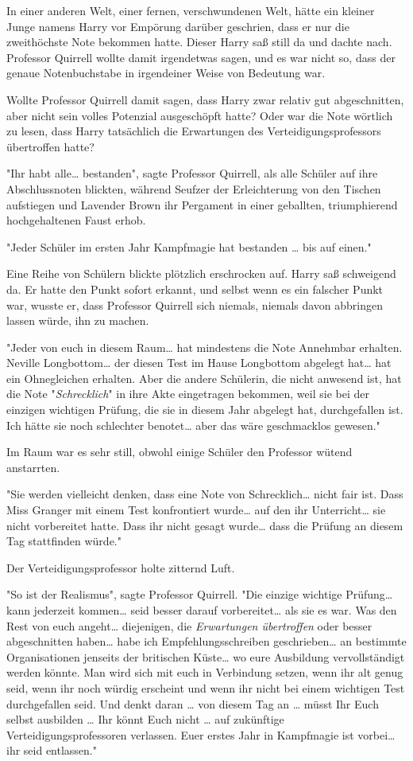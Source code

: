 {In einer anderen Welt, einer fernen, verschwundenen Welt, hätte ein kleiner Junge namens Harry vor Empörung darüber geschrien, dass er nur die zweithöchste Note bekommen hatte. Dieser Harry saß still da und dachte nach. Professor Quirrell wollte damit irgendetwas sagen, und es war nicht so, dass der genaue Notenbuchstabe in irgendeiner Weise von Bedeutung war.

Wollte Professor Quirrell damit sagen, dass Harry zwar relativ gut abgeschnitten, aber nicht sein volles Potenzial ausgeschöpft hatte? Oder war die Note wörtlich zu lesen, dass Harry tatsächlich die Erwartungen des Verteidigungsprofessors übertroffen hatte?

"Ihr habt alle… bestanden", sagte Professor Quirrell, als alle Schüler auf ihre Abschlussnoten blickten, während Seufzer der Erleichterung von den Tischen aufstiegen und Lavender Brown ihr Pergament in einer geballten, triumphierend hochgehaltenen Faust erhob.

"Jeder Schüler im ersten Jahr Kampfmagie hat bestanden … bis auf einen."

Eine Reihe von Schülern blickte plötzlich erschrocken auf. Harry saß schweigend da. Er hatte den Punkt sofort erkannt, und selbst wenn es ein falscher Punkt war, wusste er, dass Professor Quirrell sich niemals, niemals davon abbringen lassen würde, ihn zu machen.

"Jeder von euch in diesem Raum… hat mindestens die Note Annehmbar erhalten. Neville Longbottom… der diesen Test im Hause Longbottom abgelegt hat… hat ein Ohnegleichen erhalten. Aber die andere Schülerin, die nicht anwesend ist, hat die Note "\emph{Schrecklich}" in ihre Akte eingetragen bekommen, weil sie bei der einzigen wichtigen Prüfung, die sie in diesem Jahr abgelegt hat, durchgefallen ist. Ich hätte sie noch schlechter benotet… aber das wäre geschmacklos gewesen."

Im Raum war es sehr still, obwohl einige Schüler den Professor wütend anstarrten.

"Sie werden vielleicht denken, dass eine Note von Schrecklich… nicht fair ist. Dass Miss Granger mit einem Test konfrontiert wurde… auf den ihr Unterricht… sie nicht vorbereitet hatte. Dass ihr nicht gesagt wurde… dass die Prüfung an diesem Tag stattfinden würde."

Der Verteidigungsprofessor holte zitternd Luft.

"So ist der Realismus", sagte Professor Quirrell. "Die einzige wichtige Prüfung… kann jederzeit kommen… seid besser darauf vorbereitet… als sie es war. Was den Rest von euch angeht… diejenigen, die \emph{Erwartungen übertroffen} oder besser abgeschnitten haben… habe ich Empfehlungsschreiben geschrieben… an bestimmte Organisationen jenseits der britischen Küste… wo eure Ausbildung vervollständigt werden könnte. Man wird sich mit euch in Verbindung setzen, wenn ihr alt genug seid, wenn ihr noch würdig erscheint und wenn ihr nicht bei einem wichtigen Test durchgefallen seid. Und denkt daran … von diesem Tag an … müsst Ihr Euch selbst ausbilden … Ihr könnt Euch nicht … auf zukünftige Verteidigungsprofessoren verlassen. Euer erstes Jahr in Kampfmagie ist vorbei… ihr seid entlassen."

}
